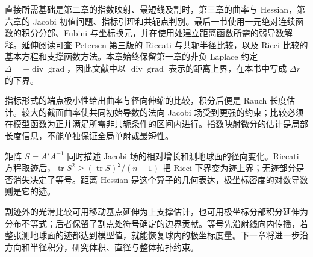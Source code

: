 \ProseParagraphBreak

直接所需基础是第二章的指数映射、最短线及割时，第三章的曲率与 Hessian，第六章的 Jacobi 初值问题、指标引理和共轭点判别。最后一节使用一元绝对连续函数的积分分部、Fubini 与坐标换元，并在使用处建立距离函数所需的弱导数解释。延伸阅读可查 Petersen 第三版的 Riccati 与共轭半径比较，以及 Ricci 比较的基本方程和支撑函数方法\cite[第6.4.1--6.4.2节，第7.1.1节，第7.1.3--7.1.4节]{Petersen2016}。本章始终保留第一章的非负 Laplace 约定 \(\Delta=-\operatorname{div}\operatorname{grad}\)，因此文献中以 \(\operatorname{div}\operatorname{grad}\) 表示的距离上界，在本书中写成 \(\Delta r\) 的下界。






\begin{chaptersummary}
	指标形式的端点极小性给出曲率与径向伸缩的比较，积分后便是 Rauch 长度估计。较大的截面曲率使共同初始导数的法向 Jacobi 场受到更强的约束；比较必须在模型函数为正并满足所需非共轭条件的区间内进行。指数映射微分的估计是局部长度信息，不能单独保证全局单射或最短性。

	\ProseParagraphBreak

	矩阵 \(S=A'A^{-1}\) 同时描述 Jacobi 场的相对增长和测地球面的径向变化。Riccati 方程取迹后，\(\operatorname{tr}S^2\ge(\operatorname{tr}S)^2/(n-1)\) 把 Ricci 下界变为迹上界；无迹部分是否消失决定了等号。距离 Hessian 是这个算子的几何表达，极坐标密度的对数导数则是它的迹。

	\ProseParagraphBreak

	割迹外的光滑比较可用移动基点延伸为上支撑估计，也可用极坐标分部积分延伸为分布不等式；后者保留了割点处符号确定的边界贡献。等号先沿射线向内传播，若整张测地球面的迹都达到模型值，就能恢复球内的极坐标度量。下一章将进一步沿方向和半径积分，研究体积、直径与整体拓扑约束。
\end{chaptersummary}

\BookExercises

